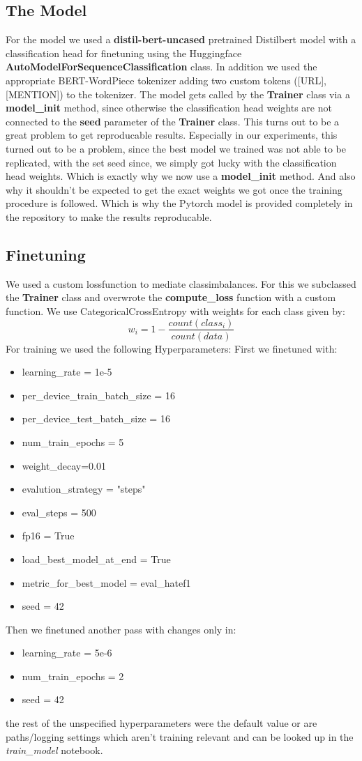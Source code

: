 \documentclass[11pt,a4paper]{article}
\begin{document}
\subsection{The Model}
For the model we used a \textbf{distil-bert-uncased} pretrained Distilbert model with a classification head for finetuning
using the Huggingface \textbf{AutoModelForSequenceClassification} class. In addition we used the appropriate BERT-WordPiece 
tokenizer adding two custom tokens ([URL],[MENTION]) to the tokenizer.
The model gets called by the \textbf{Trainer} class via a \textbf{model\_init} method, since otherwise the classification head
weights are not connected to the \textbf{seed} parameter of the \textbf{Trainer} class.
This turns out to be a great problem to get reproducable results.
Especially in our experiments, this turned out to be a problem, since the best model we trained was not able to be replicated,
with the set seed since, we simply got lucky with the classification head weights. Which is exactly why we now use a \textbf{model\_init} method.
And also why it shouldn't be expected to get the exact weights we got once the training procedure is followed.
Which is why the Pytorch model is provided completely in the repository to make the results reproducable.
\subsection{Finetuning}
We used a custom lossfunction to mediate classimbalances.
For this we subclassed the \textbf{Trainer} class and overwrote the \textbf{compute\_loss} function with a custom function.
We use CategoricalCrossEntropy with weights for each class given by:
$$ w_i = 1 - \frac{count(class_i)}{count(data)}$$
For training we used the following Hyperparameters:
First we finetuned with: 
\begin{itemize}
    \item learning\_rate = 1e-5
    \item per\_device\_train\_batch\_size = 16
    \item per\_device\_test\_batch\_size = 16
    \item num\_train\_epochs = 5
    \item weight\_decay=0.01
    \item evalution\_strategy = "steps"
    \item eval\_steps = 500
    \item fp16 = True
    \item load\_best\_model\_at\_end = True
    \item metric\_for\_best\_model = eval\_hatef1
    \item seed = 42
\end{itemize}
Then we finetuned another pass with changes only in:
\begin{itemize}
    \item learning\_rate = 5e-6
    \item num\_train\_epochs = 2
    \item seed = 42
\end{itemize}
the rest of the unspecified hyperparameters were the default value or are paths/logging settings which aren't training
relevant and can be looked up in the \textit{train\_model} notebook.
\end{document}
